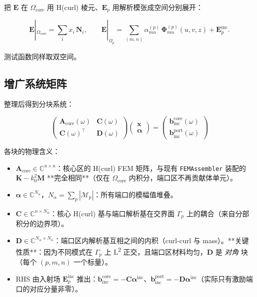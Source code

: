 \documentclass[11pt,a4paper]{ctexart}
\newcommand{\C}{\mathbb{C}}
\begin{document}
把 $\bm E$ 在 $\Omega_{\text{core}}$ 用 H(curl) 棱元、$\bm E_p$ 用解析模张成空间分别展开：

\[
  \bm E|_{\Omega_{\text{core}}} = \sum_i x_i\,\bm N_i,
  \qquad
  \bm E|_{\Omega_p} = \sum_{(m,n)} \alpha_{mn}^{(p)}\,\bm \Phi_{mn}^{(p)}(u,v,z) + \bm E_p^{\text{inc}}.
\]

测试函数同样取双空间。

\subsection{增广系统矩阵}

整理后得到分块系统：

\begin{equation}
  \boxed{
  \begin{pmatrix}
    \bm A_{\text{core}}(\omega) & \bm C(\omega) \\
    \bm C(\omega)^{\!\top}      & \bm D(\omega)
  \end{pmatrix}
  \begin{pmatrix} \bm x \\ \bm \alpha \end{pmatrix}
  =
  \begin{pmatrix} \bm b_{\text{inc}}^{\text{core}}(\omega) \\ \bm b_{\text{inc}}^{\text{port}}(\omega) \end{pmatrix}
  }
  \label{eq:tfe-system}
\end{equation}

各块的物理含义：

\begin{itemize}
\item $\bm A_{\text{core}} \in \C^{n \times n}$：核心区的 H(curl) FEM 矩阵，与现有 \texttt{FEMAssembler} 装配的 $\bm K - k_0^2 \bm M$ **完全相同**（仅在 $\Omega_{\text{core}}$ 内积分，端口区不再贡献体单元）。
\item $\bm \alpha \in \C^{N_\alpha}$，$N_\alpha = \sum_p |\mathcal M_p|$：所有端口的模幅值堆叠。
\item $\bm C \in \C^{n \times N_\alpha}$：核心 H(curl) 基与端口解析基在交界面 $\Gamma_p$ 上的耦合（来自分部积分的边界项）。
\item $\bm D \in \C^{N_\alpha \times N_\alpha}$：端口区内解析基互相之间的内积（curl-curl 与 mass）。**关键性质**：因为不同模式在 $\Gamma_p$ 上 L\textsuperscript{2} 正交，且端口区材料均匀，$\bm D$ 是 \emph{对角} 块（每个 $(p, m, n)$ 一个标量）。
\item RHS 由入射场 $\bm E^{\text{inc}}_p$ 推出：$\bm b_{\text{inc}}^{\text{core}} = -\bm C \bm \alpha^{\text{inc}}$、$\bm b_{\text{inc}}^{\text{port}} = -\bm D \bm \alpha^{\text{inc}}$（实际只有激励端口的对应分量非零）。
\end{itemize}
\end{document}

